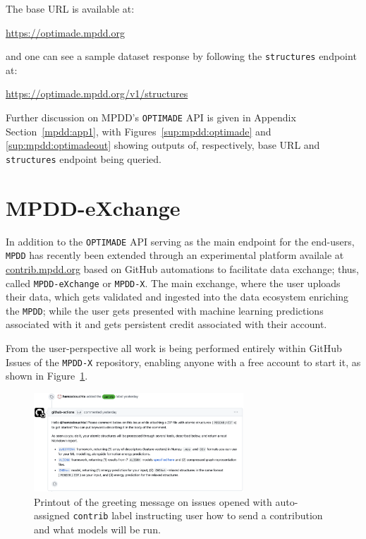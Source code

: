 The base URL is available at:

\hspace{24pt} \href{https://optimade.mpdd.org}{https://optimade.mpdd.org}

and one can see a sample dataset response by following the \texttt{structures} endpoint at:

\hspace{24pt} \href{https://optimade.mpdd.org/v1/structures}{https://optimade.mpdd.org/v1/structures}

Further discussion on MPDD's \texttt{OPTIMADE} API is given in Appendix Section~\ref{mpdd:app1}, with Figures~\ref{sup:mpdd:optimade} and \ref{sup:mpdd:optimadeout} showing outputs of, respectively, base URL and \texttt{structures} endpoint being queried.

\section{MPDD-eXchange} \label{mpdd:sec:mpddx}

In addition to the \texttt{OPTIMADE} API serving as the main endpoint for the end-users, \texttt{MPDD} has recently been extended through an experimental platform availale at \href{https://contrib.mpdd.org}{contrib.mpdd.org} based on GitHub automations to facilitate data exchange; thus, called \texttt{MPDD-eXchange} or \texttt{MPDD-X}. The main exchange, where the user uploads their data, which gets validated and ingested into the data ecosystem enriching the \texttt{MPDD}; while the user gets presented with machine learning predictions associated with it and gets persistent credit associated with their account. 

From the user-perspective all work is being performed entirely within GitHub Issues of the \texttt{MPDD-X} repository, enabling anyone with a free account to start it, as shown in Figure~\ref{mpdd:fig:mpddx1}. 

\begin{figure}[H]
    \centering
    \includegraphics[width=0.7\textwidth]{mpdd/mpddx1.png}
    \caption{Printout of the greeting message on issues opened with auto-assigned \texttt{contrib} label instructing user how to send a contribution and what models will be run.}
    \label{mpdd:fig:mpddx1}
\end{figure}

